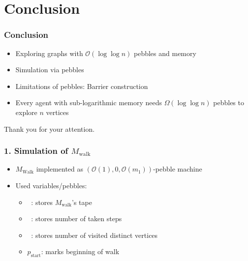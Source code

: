 \documentclass{beamer}
\DeclareMathOperator{\Tid}{T_{\text{id}}}
\DeclareMathOperator{\Tsteps}{T_{\text{steps}}}
\DeclareMathOperator{\Twalk}{T_{\text{walk}}}
\begin{document}
\section{Conclusion}
\begin{frame}
  \frametitle{Conclusion}
  \begin{itemize}
    \item Exploring graphs with $\mathcal{O}(\log\log n)$ pebbles and memory
    \item Simulation via pebbles
    \item Limitations of pebbles: Barrier construction
    \item Every agent with sub-logarithmic memory needs $\Omega(\log\log n)$
      pebbles to explore $n$ vertices
  \end{itemize}
\end{frame}

\begin{frame}
  \begin{center}
    \Huge Thank you for your attention.
  \end{center}
\end{frame}

\appendix
\begin{frame}
  \frametitle{1. Simulation of $M_{\text{walk}}$}
  \begin{itemize}
    \item $M_{\text{Walk}}$ implemented as
      $(\mathcal{O}(1), 0, \mathcal{O}(m_{1}))$-pebble machine
    \item Used variables/pebbles:
      \begin{itemize}
        \item $\Twalk$: stores $M_{\text{walk}}$'s tape
        \item $\Tsteps$: stores number of taken steps
        \item $\Tid$: stores number of visited distinct vertices
        \item $p_{\text{start}}$: marks beginning of walk
      \end{itemize}
  \end{itemize}
\end{frame}
\end{document}
